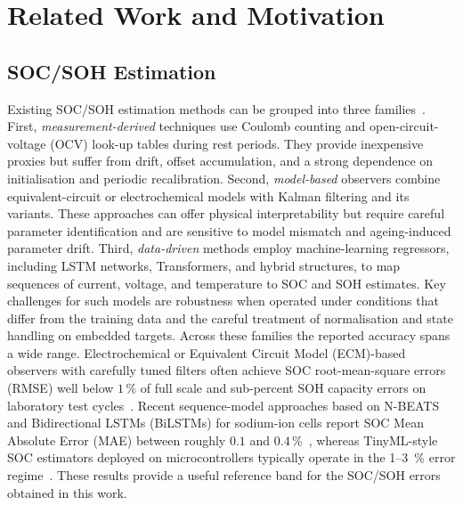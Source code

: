 \documentclass[review]{elsarticle}
\begin{document}
\section{Related Work and Motivation}
\subsection{SOC/SOH Estimation}
Existing SOC/SOH estimation methods can be grouped into three families~\cite{a.m.s.m.h.s.attanayakaEstimationStateCharge2019,berecibarCriticalReviewState2016,shrivastavaReviewTechnologicalAdvancement2023,guoSystematicReviewElectrochemical2024}. First, \emph{measurement-derived} techniques use Coulomb counting and open-circuit-voltage (OCV) look-up tables during rest periods. They provide inexpensive proxies but suffer from drift, offset accumulation, and a strong dependence on initialisation and periodic recalibration. Second, \emph{model-based} observers combine equivalent-circuit or electrochemical models with Kalman filtering and its variants. These approaches can offer physical interpretability but require careful parameter identification and are sensitive to model mismatch and ageing-induced parameter drift. Third, \emph{data-driven} methods employ machine-learning regressors, including LSTM networks, Transformers, and hybrid structures, to map sequences of current, voltage, and temperature to SOC and SOH estimates. Key challenges for such models are robustness when operated under conditions that differ from the training data and the careful treatment of normalisation and state handling on embedded targets.
Across these families the reported accuracy spans a wide range. Electrochemical or Equivalent Circuit Model (ECM)-based observers with carefully tuned filters often achieve SOC root-mean-square errors (RMSE) well below $1\,\%$ of full scale and sub-percent SOH capacity errors on laboratory test cycles~\cite{gaoCoEstimationStateofChargeStateof2022,gaoEnhancedStateofchargeEstimation2022,shenAlternativeCombinedCoestimation2022,wangFusionEstimationLithiumion2022}. Recent sequence-model approaches based on N-BEATS and Bidirectional LSTMs (BiLSTMs) for sodium-ion cells report SOC Mean Absolute Error (MAE) between roughly $0.1$ and $0.4\,\%$~\cite{sunStateChargeEstimation2023,sunStateofchargeEstimationSodiumion2024}, whereas TinyML-style SOC estimators deployed on microcontrollers typically operate in the 1--3~\% error regime~\cite{crocioniLiIonBatteriesParameter2020,giazitzisCaseStudyTiny2024,Embedded_AI_only_SOC_mobile}. These results provide a useful reference band for the SOC/SOH errors obtained in this work.
\end{document}
